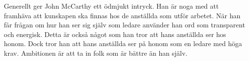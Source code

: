 Generellt ger John McCarthy ett ödmjukt intryck. Han är noga med att framhäva att kunskapen ska finnas hos de anställda som utför arbetet. När han får frågan om hur han ser sig själv som ledare använder han ord som transparent och energisk. Detta är också något som han tror att hans anställda ser hos honom. Dock tror han att hans anställda ser på honom som en ledare med höga krav. Ambitionen är att ta in folk som är bättre än han själv.